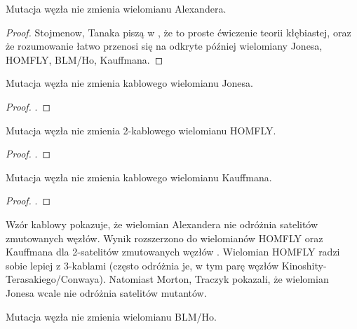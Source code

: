 \begin{proposition}
    Mutacja węzła nie zmienia wielomianu Alexandera.
\end{proposition}

\begin{proof}
    Stojmenow, Tanaka piszą w \cite{tanaka09}, że to proste ćwiczenie teorii kłębiastej, oraz że rozumowanie łatwo przenosi się na odkryte później wielomiany Jonesa, HOMFLY, BLM/Ho, Kauffmana.
\end{proof}

\begin{proposition}
    Mutacja węzła nie zmienia kablowego wielomianu Jonesa.
\end{proposition}

\begin{proof}
    \cite{menasco91}.
\end{proof}

\begin{proposition}
    Mutacja węzła nie zmienia 2-kablowego wielomianu HOMFLY.
\end{proposition}

\begin{proof}
    \cite{przytycki89}.
\end{proof}

\begin{proposition}
    Mutacja węzła nie zmienia kablowego wielomianu Kauffmana.
\end{proposition}

\begin{proof}
    \cite{lipson87}.
\end{proof}

Wzór kablowy \cite[tw. 6.15]{lickorish97} pokazuje, że wielomian Alexandera nie odróżnia satelitów zmutowanych węzłów.
Wynik rozszerzono do wielomianów HOMFLY oraz Kauffmana dla 2-satelitów zmutowanych węzłów \cite{lipson87}.
Wielomian HOMFLY radzi sobie lepiej z 3-kablami (często odróżnia je, w tym parę węzłów Kinoshity-Terasakiego/Conwaya).
Natomiast Morton, Traczyk \cite{traczyk88} pokazali, że wielomian Jonesa wcale nie odróżnia satelitów mutantów.

\begin{proposition}
    Mutacja węzła nie zmienia wielomianu BLM/Ho.
\end{proposition}


